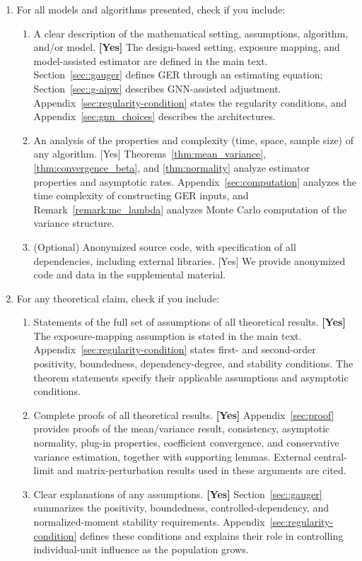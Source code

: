 \documentclass[twoside]{article}
\theoremstyle{plain}
\theoremstyle{definition}
\theoremstyle{remark}
\begin{document}
\begin{enumerate}

  \item For all models and algorithms presented, check if you include:
  \begin{enumerate}
    \item A clear description of the mathematical setting, assumptions, algorithm, and/or model. \textbf{[Yes]} The design-based setting, exposure mapping, and model-assisted estimator are defined in the main text. Section~\ref{sec::gauger} defines GER through an estimating equation; Section~\ref{sec::g-aipw} describes GNN-assisted adjustment. Appendix~\ref{sec:regularity-condition} states the regularity conditions, and Appendix~\ref{sec:gnn_choices} describes the architectures.
    \item An analysis of the properties and complexity (time, space, sample size) of any algorithm. [Yes] Theorems~\ref{thm:mean_variance}, \ref{thm:convergence_beta}, and \ref{thm:normality} analyze estimator properties and asymptotic rates. Appendix~\ref{sec:computation} analyzes the time complexity of constructing GER inputs, and Remark~\ref{remark:mc_lambda} analyzes Monte Carlo computation of the variance structure.
    \item (Optional) Anonymized source code, with specification of all dependencies, including external libraries. [Yes] We provide anonymized code and data in the supplemental material.
  \end{enumerate}

  \item For any theoretical claim, check if you include:
  \begin{enumerate}
    \item Statements of the full set of assumptions of all theoretical results. \textbf{[Yes]} The exposure-mapping assumption is stated in the main text. Appendix~\ref{sec:regularity-condition} states first- and second-order positivity, boundedness, dependency-degree, and stability conditions. The theorem statements specify their applicable assumptions and asymptotic conditions.
    \item Complete proofs of all theoretical results. \textbf{[Yes]} Appendix~\ref{sec:proof} provides proofs of the mean/variance result, consistency, asymptotic normality, plug-in properties, coefficient convergence, and conservative variance estimation, together with supporting lemmas. External central-limit and matrix-perturbation results used in these arguments are cited.
    \item Clear explanations of any assumptions. \textbf{[Yes]} Section~\ref{sec::gauger} summarizes the positivity, boundedness, controlled-dependency, and normalized-moment stability requirements. Appendix~\ref{sec:regularity-condition} defines these conditions and explains their role in controlling individual-unit influence as the population grows.
  \end{enumerate}


\end{enumerate}
\end{document}
